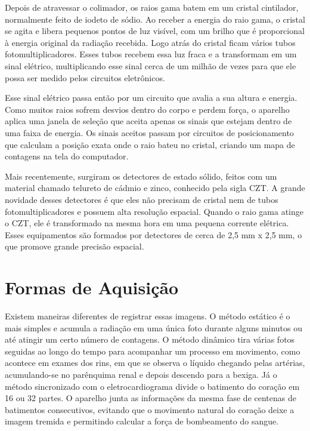 \documentclass[a4paper,12pt,oneside,openright]{abntex2}
\begin{document}
Depois de atravessar o colimador, os raios gama batem em um cristal cintilador, normalmente feito de iodeto de sódio. Ao receber a energia do raio gama, o cristal se agita e libera pequenos pontos de luz visível, com um brilho que é proporcional à energia original da radiação recebida. Logo atrás do cristal ficam vários tubos fotomultiplicadores. Esses tubos recebem essa luz fraca e a transformam em um sinal elétrico, multiplicando esse sinal cerca de um milhão de vezes para que ele possa ser medido pelos circuitos eletrônicos.

Esse sinal elétrico passa então por um circuito que avalia a sua altura e energia. Como muitos raios sofrem desvios dentro do corpo e perdem força, o aparelho aplica uma janela de seleção que aceita apenas os sinais que estejam dentro de uma faixa de energia. Os sinais aceitos passam por circuitos de posicionamento que calculam a posição exata onde o raio bateu no cristal, criando um mapa de contagens na tela do computador.

Mais recentemente, surgiram os detectores de estado sólido, feitos com um material chamado telureto de cádmio e zinco, conhecido pela sigla CZT. A grande novidade desses detectores é que eles não precisam de cristal nem de tubos fotomultiplicadores e possuem alta resolução espacial. Quando o raio gama atinge o CZT, ele é transformado na mesma hora em uma pequena corrente elétrica. Esses equipamentos são formados por detectores de cerca de 2,5 mm x 2,5 mm, o que promove grande precisão espacial. 

\section{Formas de Aquisição}

Existem maneiras diferentes de registrar essas imagens. O método estático é o mais simples e acumula a radiação em uma única foto durante alguns minutos ou até atingir um certo número de contagens. O método dinâmico tira várias fotos seguidas ao longo do tempo para acompanhar um processo em movimento, como acontece em exames dos rins, em que se observa o líquido chegando pelas artérias, acumulando-se no parênquima renal e depois descendo para a bexiga. Já o método sincronizado com o eletrocardiograma divide o batimento do coração em 16 ou 32 partes. O aparelho junta as informações da mesma fase de centenas de batimentos consecutivos, evitando que o movimento natural do coração deixe a imagem tremida e permitindo calcular a força de bombeamento do sangue.
\end{document}
